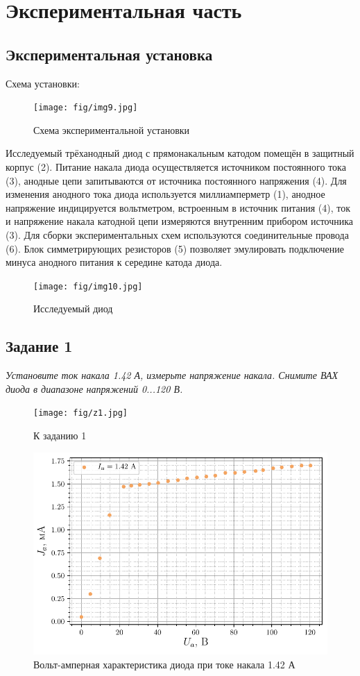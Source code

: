 \section{Экспериментальная часть}
\subsection{Экспериментальная установка}
Схема установки:
\begin{figure}[h!]
	\centering
	\texttt{[image: fig/img9.jpg]}
	\caption{Схема экспериментальной установки}
	\label{fig:10}
\end{figure}

Исследуемый трёханодный диод с прямонакальным катодом помещён в защитный корпус (2). Питание накала диода осуществляется источником постоянного тока (3), анодные цепи запитываются от источника постоянного напряжения (4). Для изменения анодного тока диода используется миллиамперметр (1), анодное напряжение индицируется вольтметром, встроенным в источник питания (4), ток и напряжение накала катодной цепи измеряются внутренним прибором источника (3). Для сборки экспериментальных схем используются соединительные провода (6). Блок симметрирующих резисторов (5) позволяет эмулировать подключение минуса анодного питания к середине катода диода.

\begin{figure}[h!]
	\centering
	\texttt{[image: fig/img10.jpg]}
	\caption{Исследуемый диод}
	\label{fig:11}
\end{figure}

\subsection{Задание 1}
\textit{Установите ток накала 1.42 А, измерьте напряжение накала. Снимите ВАХ
диода в диапазоне напряжений 0...120 В.}

\begin{figure}[h!]
	\centering
	\texttt{[image: fig/z1.jpg]}
	\caption{К заданию 1}
	\label{fig:12}
\end{figure}



\begin{figure}[H]
	\centering
    \includegraphics[scale=1]{scripts/fig1}
	\caption{Вольт-амперная характеристика диода при токе накала 1.42 А}
	\label{fig:13}
\end{figure}
\newpage
